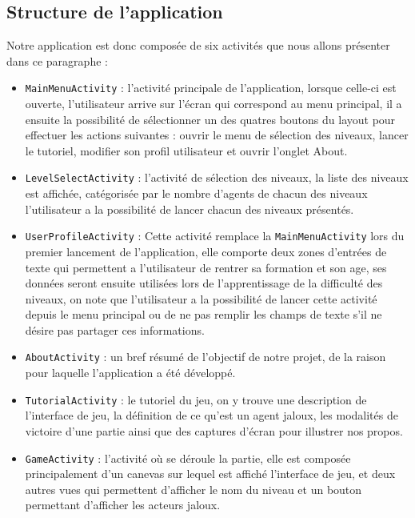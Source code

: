 \documentclass[a4paper, 10pt]{article}
\begin{document}
	\subsection{Structure de l'application}
Notre application est donc composée de six activités que nous allons présenter dans ce paragraphe :
\hfill \break
\begin{itemize}
 \item \texttt{MainMenuActivity} : l'activité principale de l'application, lorsque celle-ci est ouverte, l'utilisateur arrive sur l'écran qui correspond au menu principal, il a ensuite la possibilité de sélectionner un des quatres boutons du layout pour effectuer les actions suivantes : ouvrir le menu de sélection des niveaux, lancer le tutoriel, modifier son profil utilisateur et ouvrir l'onglet About.
 \item \texttt{LevelSelectActivity} : l'activité de sélection des niveaux, la liste des niveaux est affichée, catégorisée par le nombre d'agents de chacun des niveaux l'utilisateur a la possibilité de lancer chacun des niveaux présentés.
 \item \texttt{UserProfileActivity} : Cette activité remplace la \texttt{MainMenuActivity} lors du premier lancement de l'application, elle comporte deux zones d'entrées de texte qui permettent a l'utilisateur de rentrer sa formation et son age, ses données seront ensuite utilisées lors de l'apprentissage de la difficulté des niveaux, on note que l'utilisateur a la possibilité de lancer cette activité depuis le menu principal ou de ne pas remplir les champs de texte s'il ne désire pas partager ces informations. 
 \item\texttt{AboutActivity} : un bref résumé de l'objectif de notre projet, de la raison pour laquelle l'application a été développé.
 \item\texttt{TutorialActivity} : le tutoriel du jeu, on y trouve une description de l'interface de jeu, la définition de ce qu'est un agent jaloux, les modalités de victoire d'une partie ainsi que des captures d'écran pour illustrer nos propos.
 \item \texttt{GameActivity} : l'activité où se déroule la partie, elle est composée principalement d'un canevas sur lequel est affiché l'interface de jeu, et deux autres vues qui permettent d'afficher le nom du niveau et un bouton permettant d'afficher les acteurs jaloux.
 \end{itemize}  
 
\end{document}
